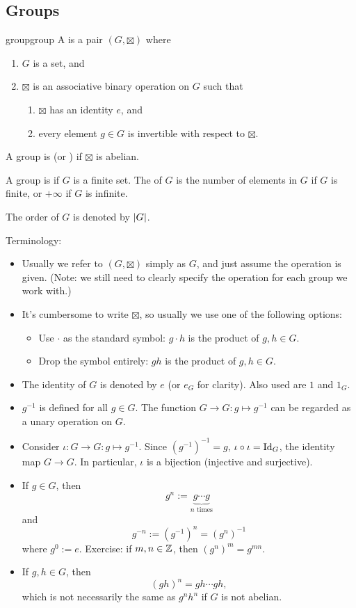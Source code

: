 \documentclass[12pt,letterpaper]{report}
\begin{document}
\pagebreak
\subsection{Groups}

\begin{defn}{group}{group}
  A  is a pair $(G, \boxtimes)$ where
  \begin{enumerate}
    \item $G$ is a set, and
    \item $\boxtimes$ is an associative binary operation on $G$ such that
    \begin{enumerate}
      \item $\boxtimes$ has an identity $e$, and
      \item every element $g \in G$ is invertible with respect to $\boxtimes$.
    \end{enumerate}
  \end{enumerate}

  A group is  (or ) if $\boxtimes$ is abelian.

  A group is  if $G$ is a finite set.
  The  of $G$ is the number of elements in $G$ if $G$ is finite, or $+\infty$ if $G$ is
  infinite.

  The order of $G$ is denoted by $\lvert G\rvert$.
\end{defn}

Terminology:
\begin{itemize}
  \item
  Usually we refer to $(G, \boxtimes)$ simply as $G$, and just assume the operation is given.
  (Note: we still need to clearly specify the operation for each group we work with.)
  \item
  It's cumbersome to write $\boxtimes$, so usually we use one of the following options:
  \begin{itemize}
    \item Use $\cdot$ as the standard symbol: $g \cdot h$ is the product of $g, h \in G$.
    \item Drop the symbol entirely: $gh$ is the product of $g, h \in G$.
  \end{itemize}
  \item
  The identity of $G$ is denoted by $e$ (or $e_G$ for clarity).
  Also used are $1$ and $1_G$.
  \item
  $g^{-1}$ is defined for all $g \in G$.
  The function $G \to G : g \mapsto g^{-1}$ can be regarded as a unary operation on $G$.
  \item
  Consider $\iota \colon G \to G : g \mapsto g^{-1}$.
  Since $(g^{-1})^{-1} = g$, $\iota \circ \iota = \operatorname{Id}_G$, the identity map $G \to G$.
  In particular, $\iota$ is a bijection (injective and surjective).
  \item
  If $g \in G$, then
  \[ g^n := \underbrace{g \cdots g}_{n \text{ times}} \]
  and
  \[ g^{-n} := (g^{-1})^n = (g^n)^{-1} \]
  where $g^0 := e$.
  Exercise: if $m, n \in \mathbb{Z}$, then $(g^n)^m = g^{mn}$.
  \item
  If $g, h \in G$, then
  \[ (gh)^n = gh \cdots gh, \]
  which is not necessarily the same as $g^n h^n$ if $G$ is not abelian.
\end{itemize}
\end{document}
